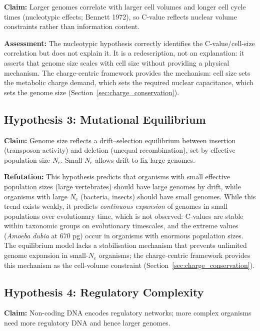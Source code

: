 \textbf{Claim:} Larger genomes correlate with larger cell volumes and
longer cell cycle times (nucleotypic effects; Bennett 1972), so C-value
reflects nuclear volume constraints rather than information content.

\textbf{Assessment:} The nucleotypic hypothesis correctly identifies the
C-value/cell-size correlation but does not explain it. It is a
redescription, not an explanation: it asserts that genome size scales
with cell size without providing a physical mechanism. The charge-centric
framework provides the mechanism: cell size sets the metabolic charge
demand, which sets the required nuclear capacitance, which sets the
genome size (Section~\ref{sec:charge_conservation}).

\subsection{Hypothesis 3: Mutational Equilibrium}
\label{ssec:mut_equilibrium}

\textbf{Claim:} Genome size reflects a drift--selection equilibrium
between insertion (transposon activity) and deletion (unequal
recombination), set by effective population size $N_e$. Small $N_e$
allows drift to fix large genomes.

\textbf{Refutation:} This hypothesis predicts that organisms with small
effective population sizes (large vertebrates) should have large genomes
by drift, while organisms with large $N_e$ (bacteria, insects) should
have small genomes. While this trend exists weakly, it predicts
\emph{continuous expansion} of genomes in small populations over
evolutionary time, which is not observed: C-values are stable within
taxonomic groups on evolutionary timescales, and the extreme values
(\textit{Amoeba dubia} at 670 pg) occur in organisms with enormous
population sizes. The equilibrium model lacks a stabilisation mechanism
that prevents unlimited genome expansion in small-$N_e$ organisms;
the charge-centric framework provides this mechanism as the cell-volume
constraint (Section~\ref{sec:charge_conservation}).

\subsection{Hypothesis 4: Regulatory Complexity}
\label{ssec:regulatory_complexity}

\textbf{Claim:} Non-coding DNA encodes regulatory networks; more complex
organisms need more regulatory DNA and hence larger genomes.


